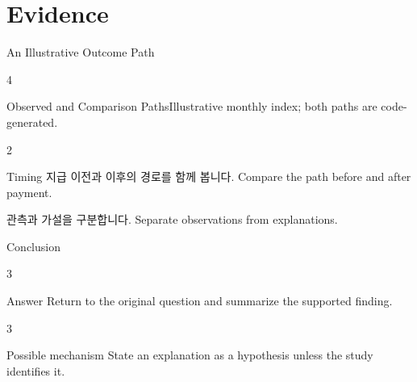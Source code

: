 \documentclass[10pt,aspectratio=169,compress]{beamer}
\begin{document}
\section[Evidence]{Evidence}
\begin{frame}{An Illustrative Outcome Path}
  \begin{GridRow}
    \begin{GridCell}{4}
      \begin{AcademicFigurePanel}{Observed and Comparison Paths}{Illustrative monthly index; both paths are code-generated.}
      \centering
      \end{AcademicFigurePanel}
    \end{GridCell}
    \begin{GridCell}{2}
      \begin{alertblock}{Timing}
        \ifABKorean 지급 이전과 이후의 경로를 함께 봅니다.\else
          Compare the path before and after payment.\fi
      \end{alertblock}
      \vspace{2mm}\small
      \ifABKorean 관측과 가설을 구분합니다.\else
      Separate observations from explanations.\fi
    \end{GridCell}
  \end{GridRow}
\end{frame}
\begin{frame}{Conclusion}
  \begin{GridRow}
    \begin{GridCell}{3}
      \begin{alertblock}{Answer}
        Return to the original question and summarize the supported finding.
      \end{alertblock}
    \end{GridCell}
    \begin{GridCell}{3}
      \begin{block}{Possible mechanism}
        State an explanation as a hypothesis unless the study identifies it.
      \end{block}
    \end{GridCell}
  \end{GridRow}
\end{frame}
\end{document}
